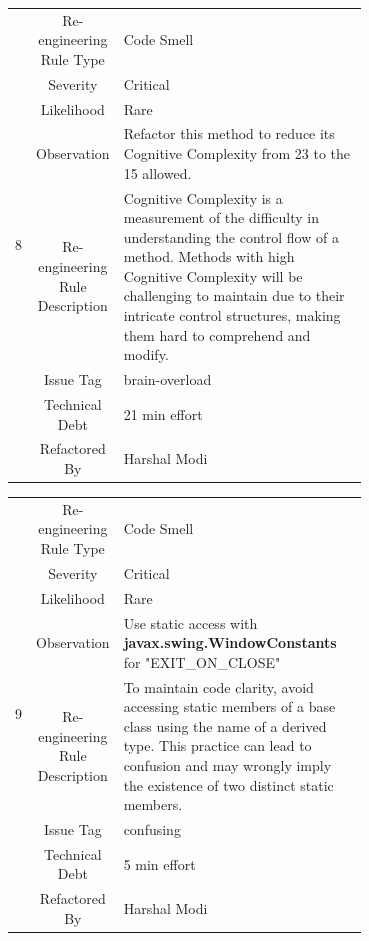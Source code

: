 \documentclass[12pt,letterpaper]{report}
\begin{document}
{\begin{table}
    \begin{tabular}{|c|c|p{0.7\linewidth}|}
    \hline   
    \multirow{8}{*}{8}
        & Re-engineering Rule Type & Code Smell \\
    \cline{2-3}
       & Severity &  Critical \\
    \cline{2-3}
       & Likelihood &  Rare \\
    \cline{2-3}
       & Observation & Refactor this method to reduce its Cognitive Complexity from 23 to the 15 allowed. \\
    \cline{2-3}
       & Re-engineering Rule Description & Cognitive Complexity is a measurement of the difficulty in understanding the control flow of a method. Methods with high Cognitive Complexity will be challenging to maintain due to their intricate control structures, making them hard to comprehend and modify.  \\
    \cline{2-3}
       & Issue Tag & brain-overload \\
    \cline{2-3}
       & Technical Debt & 21 min effort  \\
    \cline{2-3}
       & Refactored By & Harshal Modi \\
    \hline
    \end{tabular}
\end{table}

\begin{table}
    \begin{tabular}{|c|c|p{0.7\linewidth}|}
    \hline   
    \multirow{8}{*}{9}
        & Re-engineering Rule Type & Code Smell \\
    \cline{2-3}
       & Severity &  Critical \\
    \cline{2-3}
       & Likelihood &  Rare \\
    \cline{2-3}
       & Observation & Use static access with \textbf{javax.swing.WindowConstants} for "EXIT\_ON\_CLOSE" \\
    \cline{2-3}
       & Re-engineering Rule Description & To maintain code clarity, avoid accessing static members of a base class using the name of a derived type. This practice can lead to confusion and may wrongly imply the existence of two distinct static members.  \\
    \cline{2-3}
       & Issue Tag & confusing \\
    \cline{2-3}
       & Technical Debt & 5 min effort  \\
    \cline{2-3}
       & Refactored By & Harshal Modi \\
    \hline
    \end{tabular}
\end{table}

}
\end{document}

